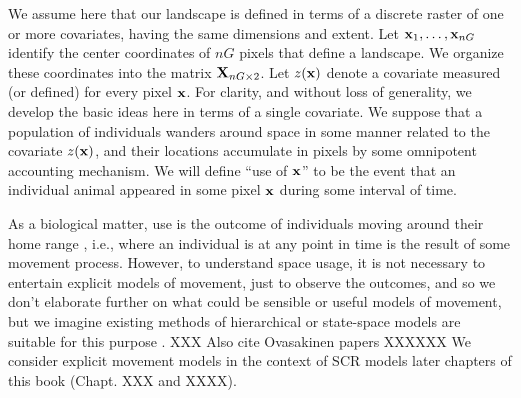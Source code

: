 We assume here that our landscape is defined in terms of a discrete
raster of one or more covariates, having the same dimensions and
extent.  Let ${\bf x}_{1},\ldots,{\bf x}_{nG}$ identify the center
coordinates of $nG$ pixels that define a landscape.  We organize these
coordinates into the matrix ${\bf X}_{nG \times 2}$.  Let $z({\bf x})$
denote a covariate measured (or defined) for every pixel ${\bf
  x}$. For clarity, and without loss of generality, we develop the
basic ideas here in terms of a single covariate.  We suppose that a
population of individuals wanders around space in some manner related
to the covariate $z({\bf x})$, and their locations accumulate in
pixels by some omnipotent accounting mechanism. We will define ``use
of ${\bf x}$'' to be the event that an individual animal appeared in
some pixel ${\bf x}$ during some interval of time.

 As a biological matter,
use is the outcome of individuals moving around their home range \citep{hooten_etal:2010},
i.e., where an individual is at any point in time is the result of
some movement process. However, to understand space usage, it is not
necessary to entertain explicit models of movement, just to observe
the outcomes, and so we don't elaborate further on what could be
sensible or useful models of movement, but we imagine existing methods
of hierarchical or state-space
models are suitable for this purpose \citep{jonsen_etal:2005,
  forester_etal:2007, patterson_etal:2008, hooten_etal:2010,
  mcclintock_etal:2012}.
XXX Also cite Ovasakinen papers XXXXXX
We consider explicit movement models in the context of SCR models
later chapters of this book
(Chapt. XXX and XXXX).


